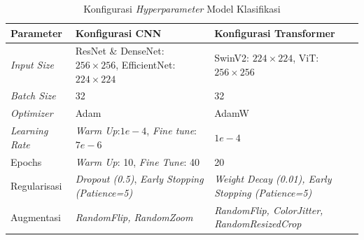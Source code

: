 \begin{longtable}{|p{2cm}|p{4cm}|p{4cm}|}
  \caption{Konfigurasi \textit{Hyperparameter} Model Klasifikasi}
  \label{tb:hyperparameter}\\
  \hline
  \rowcolor[HTML]{C0C0C0}
  \textbf{Parameter} & \textbf{Konfigurasi CNN} & \textbf{Konfigurasi Transformer} \\ \hline
  \textit{Input Size} & ResNet \& DenseNet: $256 \times 256$, EfficientNet: $224 \times 224$ & SwinV2: $224 \times 224$, ViT: $256 \times 256$ \\ \hline
  \textit{Batch Size} & 32 & 32 \\ \hline
  \textit{Optimizer} & Adam & AdamW \\ \hline
  \textit{Learning Rate} & \textit{Warm Up}:$1e-4$, \textit{Fine tune}: $7e-6$ & $1e-4$ \\ \hline
  Epochs & \textit{Warm Up}: 10, \textit{Fine Tune}: 40 & 20 \\ \hline
  Regularisasi & \textit{Dropout (0.5)}, \textit{Early Stopping (Patience=5)}& \textit{Weight Decay (0.01), Early Stopping (Patience=5)} \\ \hline
  Augmentasi & \textit{RandomFlip, RandomZoom} & \textit{RandomFlip, ColorJitter, RandomResizedCrop} \\ \hline
\end{longtable}
